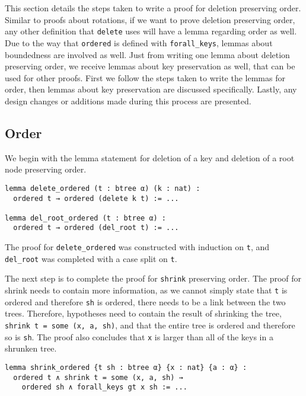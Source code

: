 This section details the steps taken to write a proof for deletion preserving order. Similar to proofs about rotations, if we want to prove deletion preserving order, any other definition that \lstinline{delete} uses will have a lemma regarding order as well. Due to the way that \lstinline{ordered} is defined with \lstinline{forall_keys}, lemmas about boundedness are involved as well. Just from writing one lemma about deletion preserving order, we receive lemmas about key preservation as well, that can be used for other proofs. First we follow the steps taken to write the lemmas for order, then lemmas about key preservation are discussed specifically. Lastly, any design changes or additions made during this process are presented.

\subsection*{Order}
 
We begin with the lemma statement for deletion of a key and deletion of a root node preserving order.

\begin{lstlisting}
lemma delete_ordered (t : btree α) (k : nat) :
  ordered t → ordered (delete k t) := ...

lemma del_root_ordered (t : btree α) :
  ordered t → ordered (del_root t) := ...
\end{lstlisting}

The proof for \lstinline{delete_ordered} was constructed with induction on \lstinline{t}, and \lstinline{del_root} was completed with a case split on \lstinline{t}.

The next step is to complete the proof for \lstinline{shrink} preserving order. The proof for shrink needs to contain more information, as we cannot simply state that \lstinline{t} is ordered and therefore \lstinline{sh} is ordered, there needs to be a link between the two trees. Therefore, hypotheses need to contain the result of shrinking the tree, \lstinline{shrink t = some (x, a, sh)}, and that the entire tree is ordered and therefore so is \lstinline{sh}. The proof also concludes that \lstinline{x} is larger than all of the keys in a shrunken tree.

\begin{lstlisting}
lemma shrink_ordered {t sh : btree α} {x : nat} {a : α} :
  ordered t ∧ shrink t = some (x, a, sh) →
    ordered sh ∧ forall_keys gt x sh := ...
\end{lstlisting}

